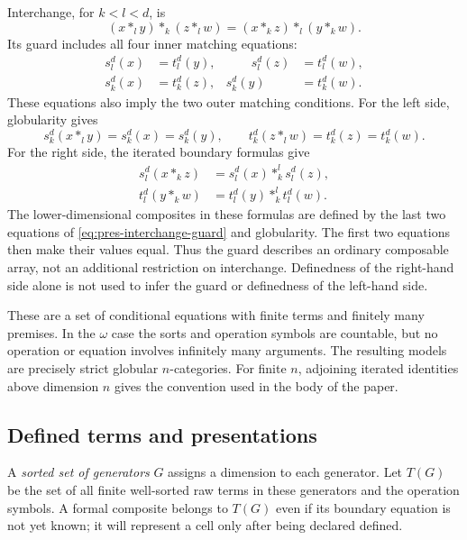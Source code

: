Interchange, for $k<l<d$, is
\begin{equation}\label{eq:pres-interchange}
 (x*_l y)*_k(z*_l w)=(x*_k z)*_l(y*_k w).
\end{equation}
Its guard includes all four inner matching equations:
\begin{equation}\label{eq:pres-interchange-guard}
\begin{aligned}
 s_l^d(x)&=t_l^d(y),&\qquad s_l^d(z)&=t_l^d(w),\\
 s_k^d(x)&=t_k^d(z),& s_k^d(y)&=t_k^d(w).
\end{aligned}
\end{equation}
These equations also imply the two outer matching conditions.
For the left side, globularity gives
\[
 s_k^d(x*_l y)=s_k^d(x)=s_k^d(y),\qquad
 t_k^d(z*_l w)=t_k^d(z)=t_k^d(w).
\]
For the right side, the iterated boundary formulas give
\[
\begin{split}
 s_l^d(x*_k z)&=s_l^d(x)*_k^l s_l^d(z),\\
 t_l^d(y*_k w)&=t_l^d(y)*_k^l t_l^d(w).
\end{split}
\]
The lower-dimensional composites in these formulas are defined by
the last two equations of \eqref{eq:pres-interchange-guard} and
globularity. The first two equations then make their values equal.
Thus the guard describes an ordinary composable array, not an
additional restriction on interchange.
Definedness of the right-hand side alone is not used to infer
the guard or definedness of the left-hand side.

These are a set of conditional equations with finite terms and
finitely many premises. In the $\omega$ case the sorts and operation
symbols are countable, but no operation or equation involves infinitely
many arguments. The resulting models are precisely strict globular
$n$-categories. For finite $n$, adjoining iterated identities above
dimension $n$ gives the convention used in the body of the paper.

\subsection{Defined terms and presentations}

A \emph{sorted set of generators} $G$ assigns a dimension to each
generator. Let $T(G)$ be the set of all finite well-sorted raw terms
in these generators and the operation symbols. A formal composite
belongs to $T(G)$ even if its boundary equation is not yet known;
it will represent a cell only after being declared defined.

